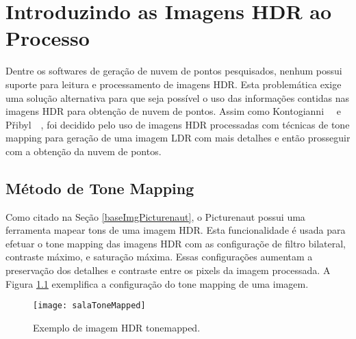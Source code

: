 \section{Introduzindo as Imagens HDR ao Processo} \label{pontosProcesso}

Dentre os softwares de geração de nuvem de pontos pesquisados, nenhum possui suporte para leitura e processamento de imagens HDR. Esta problemática exige uma solução alternativa para que seja possível o uso das informações contidas nas imagens HDR para obtenção de nuvem de pontos. Assim como Kontogianni~\etal~\cite{hdr3d} e P\v{r}ibyl~\etal~\cite{hdr3d2}, foi decidido pelo uso de imagens HDR processadas com técnicas de tone mapping para geração de uma imagem LDR com mais detalhes e então prosseguir com a obtenção da nuvem de pontos.

\subsection{Método de Tone Mapping} \label{pontosToneMapping}

Como citado na Seção \ref{baseImgPicturenaut}, o Picturenaut possui uma ferramenta mapear tons de uma imagem HDR. Esta funcionalidade é usada para efetuar o tone mapping das imagens HDR com as configuraçõe de filtro bilateral, contraste máximo, e saturação máxima. Essas configurações aumentam a preservação dos detalhes e contraste entre os pixels da imagem processada. A Figura \ref{pontosToneMapping} exemplifica a configuração do tone mapping de uma imagem.

\begin{figure}[H]
  \centering
  \texttt{[image: salaToneMapped]}
  \caption{Exemplo de imagem HDR tonemapped.}
  \label{figExemploSFM}
\end{figure}